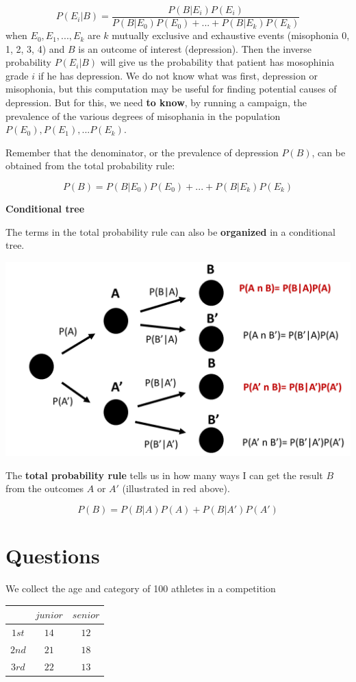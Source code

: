 \documentclass[
]{book}
\begin{document}
\[P(E_i| B)= \frac{P(B|E_i)P(E_i)}{P(B|E_0)P(E_0) +...+ P(B|E_k)P(E_k)}\]
when \(E_0, E_1, ..., E_k\) are \(k\) mutually exclusive and exhaustive events (misophonia 0, 1, 2, 3, 4) and \(B\) is an outcome of interest (depression). Then the inverse probability \(P(E_i| B)\) will give us the probability that patient has mosophinia grade \(i\) if he has depression. We do not know what was first, depression or misophonia, but this computation may be useful for finding potential causes of depression. But for this, we need \textbf{to know}, by running a campaign, the prevalence of the various degrees of misophania in the population \(P(E_0), P(E_1), ... P(E_k)\).

Remember that the denominator, or the prevalence of depression \(P(B)\), can be obtained from the total probability rule:

\[P(B)=P(B|E_0)P(E_0) +...+ P(B|E_k)P(E_k)\]

\textbf{Conditional tree}

The terms in the total probability rule can also be \textbf{organized} in a conditional tree.

\includegraphics{./figures/treetot.PNG}

The \textbf{total probability rule} tells us in how many ways I can get the result \(B\) from the outcomes \(A\) or \(A'\) (illustrated in red above).

\[P(B)=P(B|A)P(A)+P(B|A')P(A')\]

\hypertarget{questions-2}{%
\section{Questions}\label{questions-2}}

We collect the age and category of 100 athletes in a competition

\begin{longtable}[]{@{}ccc@{}}
\toprule\noalign{}
& \(junior\) & \(senior\) \\
\midrule\noalign{}
\endhead
\bottomrule\noalign{}
\endlastfoot
\(1st\) & \(14\) & \(12\) \\
\(2nd\) & \(21\) & \(18\) \\
\(3rd\) & \(22\) & \(13\) \\
\end{longtable}
\end{document}
